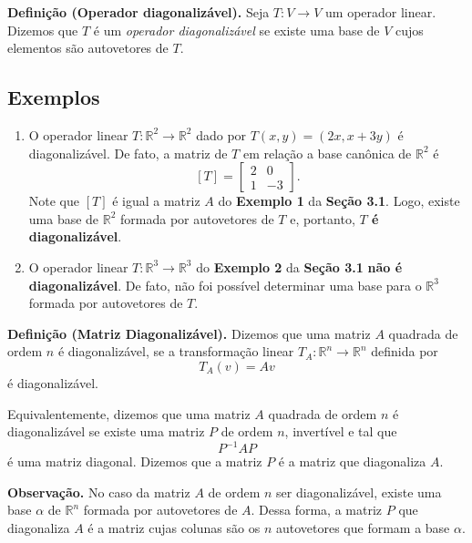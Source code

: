 \textbf{Definição (Operador diagonalizável).} Seja $T: V \rightarrow V$ um operador linear.  Dizemos que $T$ é um \textit{operador diagonalizável}  se existe uma base de $V$ cujos elementos são autovetores de $T$.

\subsection{Exemplos}
\begin{enumerate}

\item O operador linear $T: \mathbb{R}^2 \rightarrow \mathbb{R}^2$  dado por $T(x,y)=(2x, x+3y)$ é  diagonalizável. De fato,  a matriz de $T$ em relação a  base canônica de $ \mathbb{R}^2$  é $$[T]= \begin{bmatrix}
2 & 0\\
 1& -3
\end{bmatrix}.$$ Note que $[T]$ é igual a  matriz $A$ do \textbf{Exemplo 1} da \textbf{Seção 3.1}. Logo, existe uma base de $\mathbb{R}^2$ formada por autovetores de $T$ e, portanto, \textbf{$T$ é diagonalizável}.

\item O operador linear $T: \mathbb{R}^3 \rightarrow \mathbb{R}^3$ do \textbf{Exemplo 2} da \textbf{Seção 3.1} \textbf{não é diagonalizável}. De fato, não foi possível determinar uma base para o $\mathbb{R}^3$ formada por autovetores de $T$.
\end{enumerate}

\textbf{Definição (Matriz Diagonalizável).} Dizemos que uma matriz  $A$ quadrada de ordem $n$ é diagonalizável, se a transformação linear   $T_A:  \mathbb{R}^n \rightarrow \mathbb{R}^n$ definida por $$T_A(v)=Av$$ é diagonalizável.

Equivalentemente, dizemos que uma matriz  $A$ quadrada de ordem $n$ é diagonalizável se existe uma matriz $P$ de ordem $n$, invertível  e tal que $$P^{-1}AP$$ é uma matriz diagonal. Dizemos que a matriz $P$ é  a matriz que diagonaliza $A$.


\vspace{0.5cm}

\noindent \textbf{Observação.} No caso da matriz  $A$  de ordem $n$ ser diagonalizável,  existe uma base $\alpha$ de  $\mathbb{R}^n$ formada por autovetores de $A$. Dessa forma, a matriz $P$  que diagonaliza $A$ é a matriz cujas colunas são os   $n$ autovetores que formam a base  $\alpha$.




